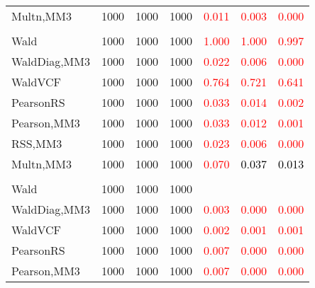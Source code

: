 \documentclass[
]{article}
\begin{document}
\begin{table}[H]
{\begin{tabular}[t]{lrrrrrr}
\hspace{1em}Multn,MM3 & 1000 & 1000 & 1000 & \textcolor{red}{0.011} & \textcolor{red}{0.003} & \textcolor{red}{0.000}\\
\addlinespace[0.3em]
\multicolumn{7}{l}{\textbf{2F 10V}}\\
\hspace{1em}Wald & 1000 & 1000 & 1000 & \textcolor{red}{1.000} & \textcolor{red}{1.000} & \textcolor{red}{0.997}\\
\hspace{1em}WaldDiag,MM3 & 1000 & 1000 & 1000 & \textcolor{red}{0.022} & \textcolor{red}{0.006} & \textcolor{red}{0.000}\\
\hspace{1em}WaldVCF & 1000 & 1000 & 1000 & \textcolor{red}{0.764} & \textcolor{red}{0.721} & \textcolor{red}{0.641}\\
\hspace{1em}PearsonRS & 1000 & 1000 & 1000 & \textcolor{red}{0.033} & \textcolor{red}{0.014} & \textcolor{red}{0.002}\\
\hspace{1em}Pearson,MM3 & 1000 & 1000 & 1000 & \textcolor{red}{0.033} & \textcolor{red}{0.012} & \textcolor{red}{0.001}\\
\hspace{1em}RSS,MM3 & 1000 & 1000 & 1000 & \textcolor{red}{0.023} & \textcolor{red}{0.006} & \textcolor{red}{0.000}\\
\hspace{1em}Multn,MM3 & 1000 & 1000 & 1000 & \textcolor{red}{0.070} & \textcolor{black}{0.037} & \textcolor{black}{0.013}\\
\addlinespace[0.3em]
\multicolumn{7}{l}{\textbf{3F 15V}}\\
\hspace{1em}Wald & 1000 & 1000 & 1000 & \textcolor{black}{} & \textcolor{black}{} & \textcolor{black}{}\\
\hspace{1em}WaldDiag,MM3 & 1000 & 1000 & 1000 & \textcolor{red}{0.003} & \textcolor{red}{0.000} & \textcolor{red}{0.000}\\
\hspace{1em}WaldVCF & 1000 & 1000 & 1000 & \textcolor{red}{0.002} & \textcolor{red}{0.001} & \textcolor{red}{0.001}\\
\hspace{1em}PearsonRS & 1000 & 1000 & 1000 & \textcolor{red}{0.007} & \textcolor{red}{0.000} & \textcolor{red}{0.000}\\
\hspace{1em}Pearson,MM3 & 1000 & 1000 & 1000 & \textcolor{red}{0.007} & \textcolor{red}{0.000} & \textcolor{red}{0.000}\\

\end{tabular}}
\end{table}
\end{document}
